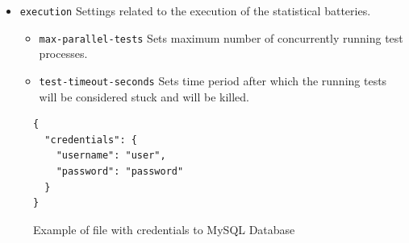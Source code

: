 \documentclass[
  digital,  	%
  color,		%
  oneside,   	%
  12pt,
  nocover,
  notable,
  nolof,
  nolot,
]{fithesis3}
\begin{document}
\begin{itemize}
\begin{itemize}
\begin{itemize}
\begin{itemize}
\end{itemize}
\item \texttt{mysql-db} -- Section with settings needed for MySQL Database storage.
\begin{itemize}
\item \texttt{address} -- Address of the MySQL server with created RTT database.
\item \texttt{port} -- Port on which the MySQL server is accessible.
\item \texttt{credentials-file} -- Path to file that contains login information for the database. For the structure of the file see Figure~\ref{fig:credentials}.
\end{itemize}
\end{itemize}
\item \texttt{binaries} -- Section with the locations of the executables of the batteries.
\begin{itemize}
\item \texttt{<battery>} -- Value \texttt{<battery>} is replaced by \texttt{nist-sts}, \texttt{dieharder} and \texttt{testu01}. All of the tags are mandatory. The values of the tags sets the locations of the executables of the respective batteries.
\end{itemize}
\item \texttt{miscelaneous} -- Section with various settings. 
\begin{itemize}
\item \texttt{nist-sts} -- Settings related to NIST STS battery.
\begin{itemize}
\item \texttt{main-result-dir} -- Sets where NIST STS stores its result files.
\end{itemize}
\end{itemize}
\end{itemize}
\item \texttt{execution} Settings related to the execution of the statistical batteries.
\begin{itemize}
\item \texttt{max-parallel-tests} Sets maximum number of concurrently running test processes.
\item \texttt{test-timeout-seconds} Sets time period after which the running tests will be considered stuck and will be killed.
\end{itemize}
\end{itemize}

\begin{figure}[h!]
\begin{lstlisting}
{
  "credentials": {
    "username": "user",
    "password": "password"
  }    
}
\end{lstlisting}
\caption{Example of file with credentials to MySQL Database}
\label{fig:credentials}
\end{figure}
\end{document}
